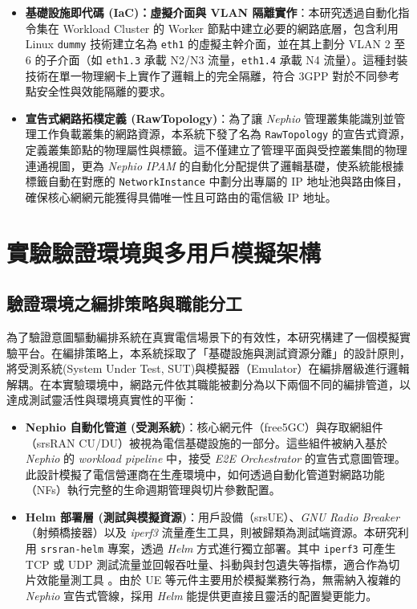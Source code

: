 \begin{itemize}
    \item \textbf{基礎設施即代碼 (IaC)：虛擬介面與 VLAN 隔離實作}：本研究透過自動化指令集在 Workload Cluster 的 Worker 節點中建立必要的網路底層，包含利用 Linux \texttt{dummy} 技術建立名為 \texttt{eth1} 的虛擬主幹介面，並在其上劃分 VLAN 2 至 6 的子介面（如 \texttt{eth1.3} 承載 N2/N3 流量，\texttt{eth1.4} 承載 N4 流量）。這種封裝技術在單一物理網卡上實作了邏輯上的完全隔離，符合 3GPP 對於不同參考點安全性與效能隔離的要求。
    \item \textbf{宣告式網路拓樸定義 (RawTopology)}：為了讓 \textit{Nephio} 管理叢集能識別並管理工作負載叢集的網路資源，本系統下發了名為 \texttt{RawTopology} 的宣告式資源，定義叢集節點的物理屬性與標籤。這不僅建立了管理平面與受控叢集間的物理連通視圖，更為 \textit{Nephio IPAM} 的自動化分配提供了邏輯基礎，使系統能根據標籤自動在對應的 \texttt{NetworkInstance} 中劃分出專屬的 IP 地址池與路由條目，確保核心網網元能獲得具備唯一性且可路由的電信級 IP 地址。
\end{itemize}

\section{實驗驗證環境與多用戶模擬架構}
\subsection{驗證環境之編排策略與職能分工}
\label{subsec:validation_strategy}

為了驗證意圖驅動編排系統在真實電信場景下的有效性，本研究構建了一個模擬實驗平台。在編排策略上，本系統採取了「基礎設施與測試資源分離」的設計原則，將受測系統(System Under Test, SUT)與模擬器（Emulator）在編排層級進行邏輯解耦。在本實驗環境中，網路元件依其職能被劃分為以下兩個不同的編排管道，以達成測試靈活性與環境真實性的平衡：

\begin{itemize}
    \item \textbf{Nephio 自動化管道 (受測系統)}：核心網元件（free5GC）與存取網組件（srsRAN CU/DU）被視為電信基礎設施的一部分。這些組件被納入基於 \textit{Nephio} 的 \textit{workload pipeline} 中，接受 \textit{E2E Orchestrator} 的宣告式意圖管理。此設計模擬了電信營運商在生產環境中，如何透過自動化管道對網路功能（NFs）執行完整的生命週期管理與切片參數配置。
    \item \textbf{Helm 部署層 (測試與模擬資源)}：用戶設備（srsUE）、\textit{GNU Radio Breaker}（射頻橋接器）以及 \textit{iperf3} 流量產生工具，則被歸類為測試端資源。本研究利用 \texttt{srsran-helm} 專案，透過 \textit{Helm} 方式進行獨立部署。其中 \texttt{iperf3} 可產生 TCP 或 UDP 測試流量並回報吞吐量、抖動與封包遺失等指標，適合作為切片效能量測工具 \cite{iperf3_manual}。由於 UE 等元件主要用於模擬業務行為，無需納入複雜的 \textit{Nephio} 宣告式管線，採用 \textit{Helm} 能提供更直接且靈活的配置變更能力。
\end{itemize}

